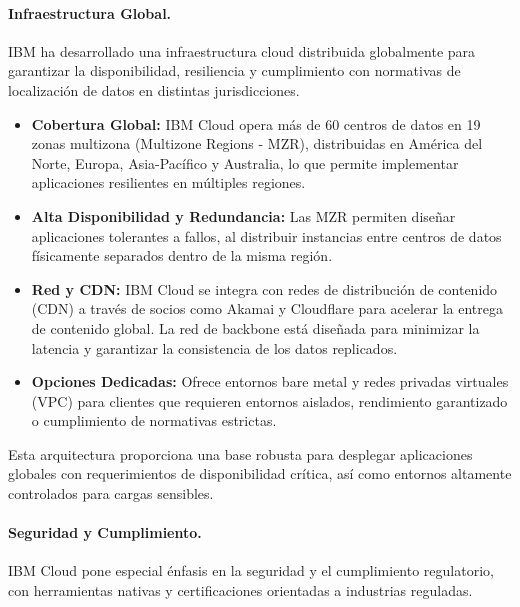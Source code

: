 {                \paragraph{Infraestructura Global.}
                IBM ha desarrollado una infraestructura cloud distribuida globalmente para garantizar la disponibilidad, resiliencia y cumplimiento con normativas de localización de datos en distintas jurisdicciones.
                
                \begin{itemize}
                    \item \textbf{Cobertura Global:} IBM Cloud opera más de 60 centros de datos en 19 zonas multizona (Multizone Regions - MZR), distribuidas en América del Norte, Europa, Asia-Pacífico y Australia, lo que permite implementar aplicaciones resilientes en múltiples regiones.
                    \item \textbf{Alta Disponibilidad y Redundancia:} Las MZR permiten diseñar aplicaciones tolerantes a fallos, al distribuir instancias entre centros de datos físicamente separados dentro de la misma región.
                    \item \textbf{Red y CDN:} IBM Cloud se integra con redes de distribución de contenido (CDN) a través de socios como Akamai y Cloudflare para acelerar la entrega de contenido global. La red de backbone está diseñada para minimizar la latencia y garantizar la consistencia de los datos replicados.
                    \item \textbf{Opciones Dedicadas:} Ofrece entornos bare metal y redes privadas virtuales (VPC) para clientes que requieren entornos aislados, rendimiento garantizado o cumplimiento de normativas estrictas.
                \end{itemize}
                
                Esta arquitectura proporciona una base robusta para desplegar aplicaciones globales con requerimientos de disponibilidad crítica, así como entornos altamente controlados para cargas sensibles.
                
                \paragraph{Seguridad y Cumplimiento.}
                IBM Cloud pone especial énfasis en la seguridad y el cumplimiento regulatorio, con herramientas nativas y certificaciones orientadas a industrias reguladas.
                
}
